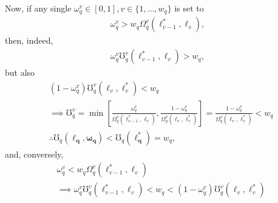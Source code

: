 \documentclass[hidelinks, nonatbib]{elsarticle}
\begin{document}
\begin{enumerate}
    Now, if any single $\omega_{q}^{v} \in [0,1], v \in \{1, \dots, w_q\}$ is set to
    \begin{gather}
        \omega_{q}^{v} > w_q
        \Omega_{q}^{v}(
            \ell_{v-1}^{*}
            ,\ell_{v}
        )
        ,
    \end{gather}
    then, indeed,
    \begin{gather}
        \omega_{q}^{v}
        \mho_{q}^{v}(
            \ell_{v-1}^{*}
            ,\ell_{v}
        )
        >
        w_q
        ,
    \end{gather}
    but also
    \begin{align}
        &
        (1-\omega_{q}^{v})
        \mho_{q}^{v}(
            \ell_{v}
            ,\ell_{v}^{*}
        )
        <
        w_q
        \\
        &\implies
        \mho_{q}^{v} = 
        \min\left[
            \frac{
                \omega_{q}^{v}
            }{
                \Omega_{q}^{v}(
                    \ell_{v-1}^{*}
                    ,\ell_{v}
                )
            }
            ,
            \frac{
                1-\omega_{q}^{v}
            }{
                \Omega_{q}^{v}(
                    \ell_{v}
                    ,\ell_{v}^{*}
                )
            }
        \right]
        =
        \frac{
            1-\omega_{q}^{v}
        }{
            \Omega_{q}^{v}(
                \ell_{v}
                ,\ell_{v}^{*}
            )
        }
        <
        w_q
        \\
        &\therefore
        \mho_{q}(
            \boldsymbol{\ell_q}
            ,\boldsymbol{\omega_q}
        ) 
        <
        \mho_{q}(
            \boldsymbol{\ell_{q}^{*}}
        )
        =
        w_q
        ,
    \end{align}
    and, conversely, 
    \begin{align}
        &
        \omega_{q}^{v} < 
        w_q
        \Omega_{q}^{v}(
            \ell_{v-1}^{*}
            ,\ell_{v}
        )
        \\
        &\implies
        \omega_{q}^{v}
        \mho_{q}^{v}(
            \ell_{v-1}^{*}
            ,\ell_{v}
        )
        < 
        w_q
        <
        (1-\omega_{q}^{v})
        \mho_{q}^{v}(
            \ell_{v}
            ,\ell_{v}^{*}
        )

\end{align}
\end{enumerate}
\end{document}
